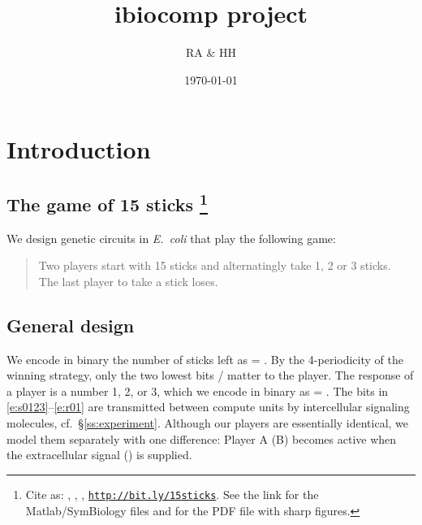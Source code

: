 \documentclass[12pt,notitlepage]{article}
\title{ibiocomp project}
\author{RA \& HH}
\date{\today}
\def\[#1\]{\begin{align}#1\end{align}}
\newcommand{\ra}[1]{{\color{Blue}#1}}
\newcommand{\linktodoc}{http://bit.ly/15sticks}
\begin{document}
\maketitle

\section{Introduction}

\subsection{The game of 15 sticks%
	\texorpdfstring{\footnote{%
		Cite as:
		\MyTitle, \MyAuthor, \MyDate,
		\href{\linktodoc}{{\texttt{\linktodoc}}}.
		See the link 
		for the Matlab/SymBiology files
		and 
		for the PDF file with sharp figures.%
	}}{}%
}


We design genetic circuits
\ra{in \emph{E.~coli}}
that play the following game:
%
\begin{quote}
	Two players start with 15 sticks
	and alternatingly 
	take 1, 2 or 3 sticks.
	\\
	The last player to take a stick loses.
\end{quote}



%



\subsection{General design} \label{s:general}

We encode in binary 
the number of sticks left as
\[
    \label{e:s0123}
     = 
    .
\]
%
%
By the 4-periodicity of the winning strategy,
only the two lowest bits /
matter to the player.
%
%
The response of a player is a number 1, 2, or 3,
which we encode in binary as
\[
    \label{e:r01}
     = 
    .
\]
%
The bits in \eqref{e:s0123}--\eqref{e:r01}
are transmitted 
between compute units
by 
intercellular signaling molecules,
cf.~\S\ref{ss:experiment}.
%
Although our players are essentially identical,
we model them separately with one difference:
Player A (B) becomes active when 
the extracellular signal  () is supplied.
\end{document}
